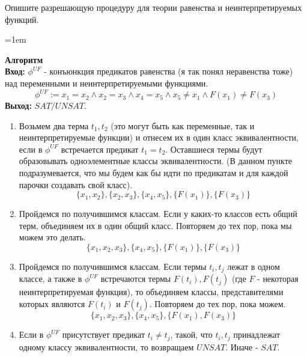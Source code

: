 \documentclass[12pt]{extreport}
\theoremstyle{definiton}
\theoremstyle{definition}
\theoremstyle{definition}
\newcommand{\solution}[2][\color{myblue}Ответ]{
\medskip
	\noindent{\bfseries #1 }{{\color{myblue}\bfseries #2:}}
}
\newenvironment{blockquote}{%
  \par%
  \medskip
  \leftskip=1em%
  \noindent}{%
  \par\medskip}
\begin{document}
\Pr[Паша] Опишите разрешающую процедуру для теории равенства и неинтерпретируемых функций.
			
\solution{15}
\begin{blockquote}
{\color{myblue}
\noindent \textbf{Алгоритм}\\
\textbf{Вход: } $\phi^{UF}$ - конъюнкция предикатов равенства (я так понял неравенства тоже) над переменными и неинтерпретируемыми
функциями.\\
$$
\phi^{UF}:=x_1=x_2 \wedge x_2=x_3 \wedge x_4 = x_5 \wedge x_5 \neq x_1 \wedge F(x_1) \neq F(x_3)
$$
\textbf{Выход: } $SAT/UNSAT$.
\begin{enumerate}
    \item Возьмем два терма $t_1, t_2$ (это могут быть как переменные, так и неинтерпретируемые
    функции) и отнесем их в один класс эквивалентности, если в $\phi^{UF}$ встречается предикат
    $t_1 = t_2$. Оставшиеся термы будут образовывать одноэлементные классы эквивалентности. (В данном пункте подразумевается, что мы будем как бы идти по предикатам и для каждой парочки создавать свой класс).\\
    $$
    \{x_1, x_2\},\{x_2, x_3\}, \{x_4, x_5\},\{F(x_1)\},\{F(x_3)\}
    $$
    \item Пройдемся по получившимся классам. Если у каких-то классов есть общий терм, объединяем
    их в один общий класс. Повторяем до тех пор, пока мы можем это делать.\\
    $$
    \{x_1, x_2, x_3\},\{x_4, x_5\},\{F(x_1)\},\{F(x_3)\}
    $$
    \item Пройдемся по получившимся классам. Если термы $t_i, t_j$ лежат в одном классе, а также 
    в $\phi^{UF}$ встречаются термы $F(t_i), F(t_j)$ (где $F$ - некоторая неинтерпретируемая функция), то объединяем классы, представителями которых являются $F(t_i)$ и $F(t_j)$.
    Повторяем до тех пор, пока можем.\\
    $$
    \{x_1, x_2, x_3\},\{x_4, x_5\},\{F(x_1), F(x_3)\}
    $$
    \item Если в $\phi^{UF}$ присутствует предикат $t_i \neq t_j$, такой, что $t_i, t_j$ принадлежат одному классу эквивалентности, то возвращаем $UNSAT$. Иначе - $SAT$.
    
\end{enumerate}

}
\end{blockquote}
\end{document}
